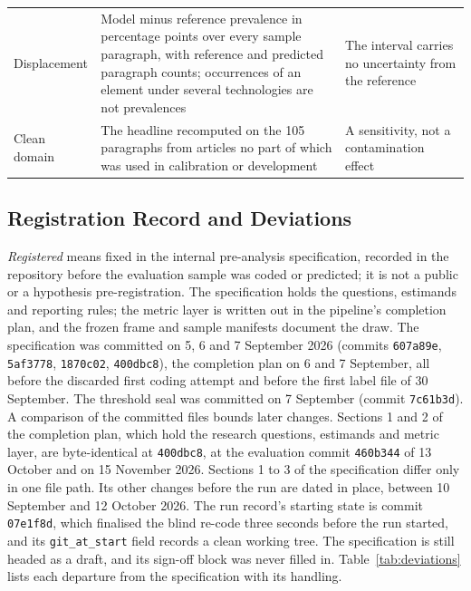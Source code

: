 \begin{longtable}{@{}>{\raggedright\arraybackslash}p{27mm}>{\raggedright\arraybackslash}p{80mm}>{\raggedright\arraybackslash}p{45mm}@{}}
Displacement & Model minus reference prevalence in percentage points over every sample paragraph, with reference and predicted paragraph counts; occurrences of an element under several technologies are not prevalences & The interval carries no uncertainty from the reference \\
Clean domain & The headline recomputed on the 105 paragraphs from articles no part of which was used in calibration or development & A sensitivity, not a contamination effect \\
\end{longtable}
\endgroup

\subsection{Registration Record and Deviations}\label{app:protocol}

\emph{Registered} means fixed in the internal pre-analysis specification, recorded in the repository before the evaluation sample was coded or predicted; it is not a public or a hypothesis pre-registration. The specification holds the questions, estimands and reporting rules; the metric layer is written out in the pipeline's completion plan, and the frozen frame and sample manifests document the draw. The specification was committed on 5, 6 and 7 September 2026 (commits \texttt{607a89e}, \texttt{5af3778}, \texttt{1870c02}, \texttt{400dbc8}), the completion plan on 6 and 7 September, all before the discarded first coding attempt and before the first label file of 30 September. The threshold seal was committed on 7 September (commit \texttt{7c61b3d}). A comparison of the committed files bounds later changes. Sections 1 and 2 of the completion plan, which hold the research questions, estimands and metric layer, are byte-identical at \texttt{400dbc8}, at the evaluation commit \texttt{460b344} of 13 October and on 15 November 2026. Sections 1 to 3 of the specification differ only in one file path. Its other changes before the run are dated in place, between 10 September and 12 October 2026. The run record's starting state is commit \texttt{07e1f8d}, which finalised the blind re-code three seconds before the run started, and its \texttt{git\_at\_start} field records a clean working tree. The specification is still headed as a draft, and its sign-off block was never filled in. Table~\ref{tab:deviations} lists each departure from the specification with its handling.

